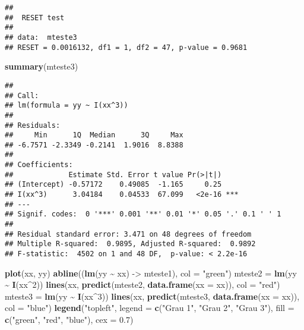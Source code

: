 \documentclass[
]{book}
\newenvironment{Shaded}{\begin{snugshade}}{\end{snugshade}}
\newcommand{\AttributeTok}[1]{\textcolor[rgb]{0.13,0.29,0.53}{#1}}
\newcommand{\DecValTok}[1]{\textcolor[rgb]{0.00,0.00,0.81}{#1}}
\newcommand{\FloatTok}[1]{\textcolor[rgb]{0.00,0.00,0.81}{#1}}
\newcommand{\FunctionTok}[1]{\textcolor[rgb]{0.13,0.29,0.53}{\textbf{#1}}}
\newcommand{\NormalTok}[1]{#1}
\newcommand{\OtherTok}[1]{\textcolor[rgb]{0.56,0.35,0.01}{#1}}
\newcommand{\SpecialCharTok}[1]{\textcolor[rgb]{0.81,0.36,0.00}{\textbf{#1}}}
\newcommand{\StringTok}[1]{\textcolor[rgb]{0.31,0.60,0.02}{#1}}
\begin{document}
\begin{verbatim}
## 
##  RESET test
## 
## data:  mteste3
## RESET = 0.0016132, df1 = 1, df2 = 47, p-value = 0.9681
\end{verbatim}

\begin{Shaded}
\begin{Highlighting}[]
\FunctionTok{summary}\NormalTok{(mteste3)}
\end{Highlighting}
\end{Shaded}

\begin{verbatim}
## 
## Call:
## lm(formula = yy ~ I(xx^3))
## 
## Residuals:
##     Min      1Q  Median      3Q     Max 
## -6.7571 -2.3349 -0.2141  1.9016  8.8388 
## 
## Coefficients:
##             Estimate Std. Error t value Pr(>|t|)    
## (Intercept) -0.57172    0.49085  -1.165     0.25    
## I(xx^3)      3.04184    0.04533  67.099   <2e-16 ***
## ---
## Signif. codes:  0 '***' 0.001 '**' 0.01 '*' 0.05 '.' 0.1 ' ' 1
## 
## Residual standard error: 3.471 on 48 degrees of freedom
## Multiple R-squared:  0.9895, Adjusted R-squared:  0.9892 
## F-statistic:  4502 on 1 and 48 DF,  p-value: < 2.2e-16
\end{verbatim}

\begin{Shaded}
\begin{Highlighting}[]
\FunctionTok{plot}\NormalTok{(xx, yy)}
\FunctionTok{abline}\NormalTok{((}\FunctionTok{lm}\NormalTok{(yy }\SpecialCharTok{\textasciitilde{}}\NormalTok{ xx) }\OtherTok{{-}\textgreater{}}\NormalTok{ mteste1), }\AttributeTok{col =} \StringTok{"green"}\NormalTok{)}
\NormalTok{mteste2 }\OtherTok{=} \FunctionTok{lm}\NormalTok{(yy }\SpecialCharTok{\textasciitilde{}} \FunctionTok{I}\NormalTok{(xx}\SpecialCharTok{\^{}}\DecValTok{2}\NormalTok{))}
\FunctionTok{lines}\NormalTok{(xx, }\FunctionTok{predict}\NormalTok{(mteste2, }\FunctionTok{data.frame}\NormalTok{(}\AttributeTok{xx =}\NormalTok{ xx)), }\AttributeTok{col =} \StringTok{"red"}\NormalTok{)}
\NormalTok{mteste3 }\OtherTok{=} \FunctionTok{lm}\NormalTok{(yy }\SpecialCharTok{\textasciitilde{}} \FunctionTok{I}\NormalTok{(xx}\SpecialCharTok{\^{}}\DecValTok{3}\NormalTok{))}
\FunctionTok{lines}\NormalTok{(xx, }\FunctionTok{predict}\NormalTok{(mteste3, }\FunctionTok{data.frame}\NormalTok{(}\AttributeTok{xx =}\NormalTok{ xx)), }\AttributeTok{col =} \StringTok{"blue"}\NormalTok{)}
\FunctionTok{legend}\NormalTok{(}\StringTok{"topleft"}\NormalTok{, }\AttributeTok{legend =} \FunctionTok{c}\NormalTok{(}\StringTok{"Grau 1"}\NormalTok{, }\StringTok{"Grau 2"}\NormalTok{, }\StringTok{"Grau 3"}\NormalTok{), }\AttributeTok{fill =} \FunctionTok{c}\NormalTok{(}\StringTok{"green"}\NormalTok{,}
    \StringTok{"red"}\NormalTok{, }\StringTok{"blue"}\NormalTok{), }\AttributeTok{cex =} \FloatTok{0.7}\NormalTok{)}
\end{Highlighting}
\end{Shaded}
\end{document}
